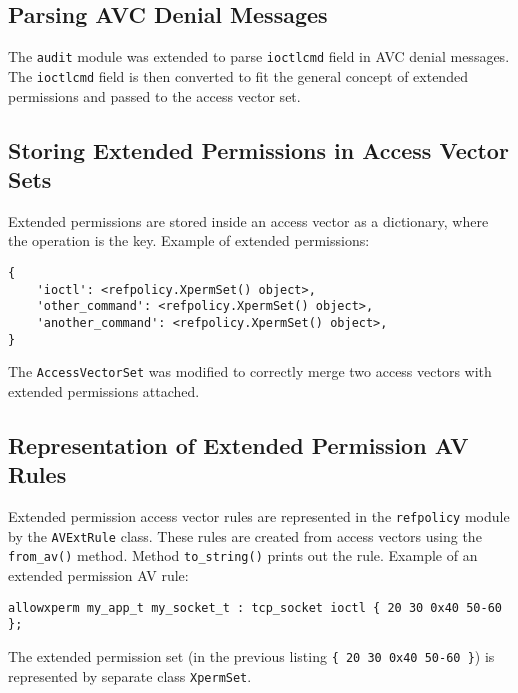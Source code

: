 \subsection{Parsing AVC Denial Messages}
The \texttt{audit} module was extended to parse \texttt{ioctlcmd} field in AVC
denial messages. The \texttt{ioctlcmd} field is then converted to fit the
general concept of extended permissions and passed to the access vector set.

\subsection{Storing Extended Permissions in Access Vector Sets}
Extended permissions are stored inside an access vector as a dictionary, where
the operation is the key. Example of extended permissions:
\begin{lstlisting}
{
    'ioctl': <refpolicy.XpermSet() object>,
    'other_command': <refpolicy.XpermSet() object>,
    'another_command': <refpolicy.XpermSet() object>,
}
\end{lstlisting}
The \texttt{AccessVectorSet} was modified to correctly merge two access vectors
with extended permissions attached.

\subsection{Representation of Extended Permission AV Rules}
Extended permission access vector rules are represented in the
\texttt{refpolicy} module by the \texttt{AVExtRule} class. These rules are
created from access vectors using the \texttt{from\_av()} method. Method
\texttt{to\_string()} prints out the rule. Example of an extended permission AV
rule:
\begin{lstlisting}
allowxperm my_app_t my_socket_t : tcp_socket ioctl { 20 30 0x40 50-60 };
\end{lstlisting}

The extended permission set (in the previous listing \texttt{\{ 20 30 0x40 50-60
\}}) is represented by separate class \texttt{XpermSet}.

